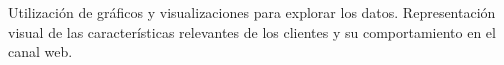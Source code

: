 Utilización de gráficos y visualizaciones para explorar los datos.
Representación visual de las características relevantes de los clientes y su comportamiento en el canal web.



